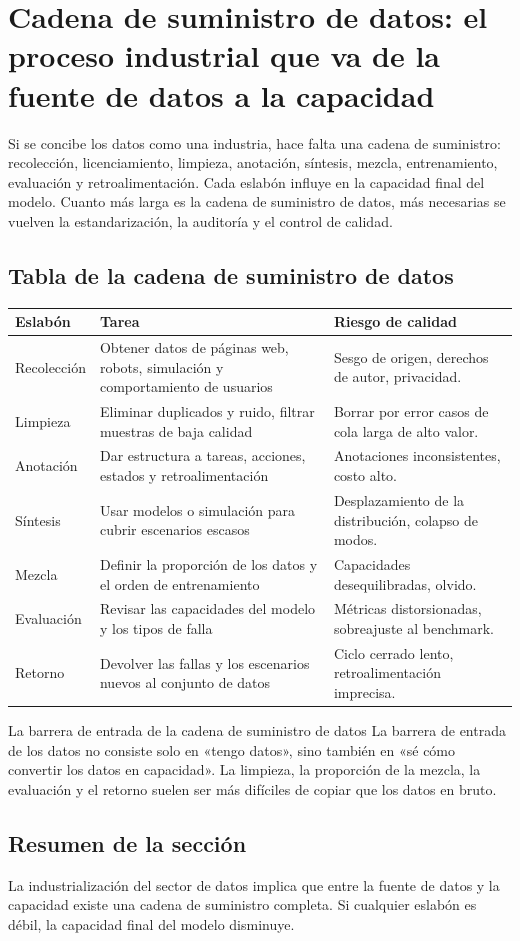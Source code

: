\section{Cadena de suministro de datos: el proceso industrial que va de la fuente de datos a la capacidad}

Si se concibe los datos como una industria, hace falta una cadena de suministro: recolección, licenciamiento, limpieza, anotación, síntesis, mezcla, entrenamiento, evaluación y retroalimentación. Cada eslabón influye en la capacidad final del modelo. Cuanto más larga es la cadena de suministro de datos, más necesarias se vuelven la estandarización, la auditoría y el control de calidad.

\subsection{Tabla de la cadena de suministro de datos}

\noindent\begin{longtable}{p{}p{}p{}}
\toprule
Eslabón & Tarea & Riesgo de calidad \\
\midrule
Recolección & Obtener datos de páginas web, robots, simulación y comportamiento de usuarios & Sesgo de origen, derechos de autor, privacidad. \\
Limpieza & Eliminar duplicados y ruido, filtrar muestras de baja calidad & Borrar por error casos de cola larga de alto valor. \\
Anotación & Dar estructura a tareas, acciones, estados y retroalimentación & Anotaciones inconsistentes, costo alto. \\
Síntesis & Usar modelos o simulación para cubrir escenarios escasos & Desplazamiento de la distribución, colapso de modos. \\
Mezcla & Definir la proporción de los datos y el orden de entrenamiento & Capacidades desequilibradas, olvido. \\
Evaluación & Revisar las capacidades del modelo y los tipos de falla & Métricas distorsionadas, sobreajuste al benchmark. \\
Retorno & Devolver las fallas y los escenarios nuevos al conjunto de datos & Ciclo cerrado lento, retroalimentación imprecisa. \\
\bottomrule
\end{longtable}

\begin{knowledgebox}{La barrera de entrada de la cadena de suministro de datos}
La barrera de entrada de los datos no consiste solo en «tengo datos», sino también en «sé cómo convertir los datos en capacidad». La limpieza, la proporción de la mezcla, la evaluación y el retorno suelen ser más difíciles de copiar que los datos en bruto.
\end{knowledgebox}

\subsection{Resumen de la sección}

La industrialización del sector de datos implica que entre la fuente de datos y la capacidad existe una cadena de suministro completa. Si cualquier eslabón es débil, la capacidad final del modelo disminuye.
